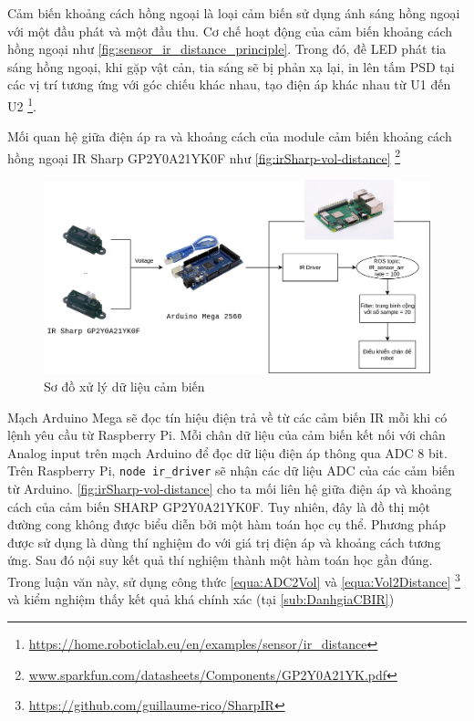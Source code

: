 Cảm biến khoảng cách hồng ngoại là loại cảm biến sử dụng ánh sáng hồng ngoại với một đầu phát và một đầu thu. Cơ chế hoạt động của cảm biến khoảng cách hồng ngoại như \figurename{ \ref{fig:sensor_ir_distance_principle}}. Trong đó, đề LED phát tia sáng hồng ngoại, khi gặp vật cản, tia sáng sẽ bị phản xạ lại, in lên tấm PSD tại các vị trí tương ứng với góc chiếu khác nhau, tạo điện áp khác nhau từ U1 đến U2 \footnote{\url{https://home.roboticlab.eu/en/examples/sensor/ir_distance}}.

Mối quan hệ giữa điện áp ra và khoảng cách của module cảm biến khoảng cách hồng ngoại IR Sharp GP2Y0A21YK0F như \figurename{ \ref{fig:irSharp-vol-distance}} \footnote{\url{www.sparkfun.com/datasheets/Components/GP2Y0A21YK.pdf}}

\begin{figure}[htbp]
    \centering
    \includegraphics[width=\linewidth]{figures/ir_safety_controller-dataProcessing.png}
    \caption{Sơ đồ xử lý dữ liệu cảm biến}
    \label{fig:workflow-dataProcessing}
\end{figure}

Mạch Arduino Mega sẽ đọc tín hiệu điện trả về từ các cảm biến IR mỗi khi có lệnh yêu cầu từ Raspberry Pi. Mỗi chân dữ liệu của cảm biến kết nối với chân Analog input trên mạch Arduino để đọc dữ liệu điện áp thông qua ADC 8 bit.
Trên Raspberry Pi, {\tt node ir\_driver} sẽ nhận các dữ liệu ADC của các cảm biến từ Arduino. \figurename{ \ref{fig:irSharp-vol-distance}} cho ta mối liên hệ giữa điện áp và khoảng cách của cảm biến SHARP GP2Y0A21YK0F. Tuy nhiên, đây là đồ thị một đường cong không được biểu diễn bởi một hàm toán học cụ thể. Phương pháp được sử dụng là dùng thí nghiệm đo với giá trị điện áp và khoảng cách tương ứng. Sau đó nội suy kết quả thí nghiệm thành một hàm toán học gần đúng. Trong luận văn này, sử dụng công thức \ref{equa:ADC2Vol} và \ref{equa:Vol2Distance} \footnote{\url{https://github.com/guillaume-rico/SharpIR}} và kiểm nghiệm thấy kết quả khá chính xác (tại \ref{sub:DanhgiaCBIR})


